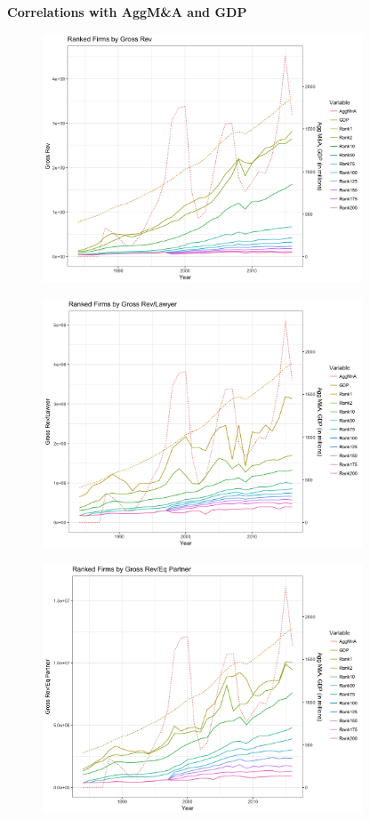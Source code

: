 \documentclass{article}
\begin{document}
\newpage
{\large \textbf{Correlations with AggM\&A and GDP} }
\begin{figure}[H]\centering
\includegraphics[width=0.85\textwidth]{../IndivTexOutput/MnAGDP-1.jpg}\end{figure}

\begin{figure}[H]\centering
\includegraphics[width=0.85\textwidth]{../IndivTexOutput/MnAGDP-2.jpg}\end{figure}

\begin{figure}[H]\centering
\includegraphics[width=0.85\textwidth]{../IndivTexOutput/MnAGDP-3.jpg}\end{figure}
\end{document}
